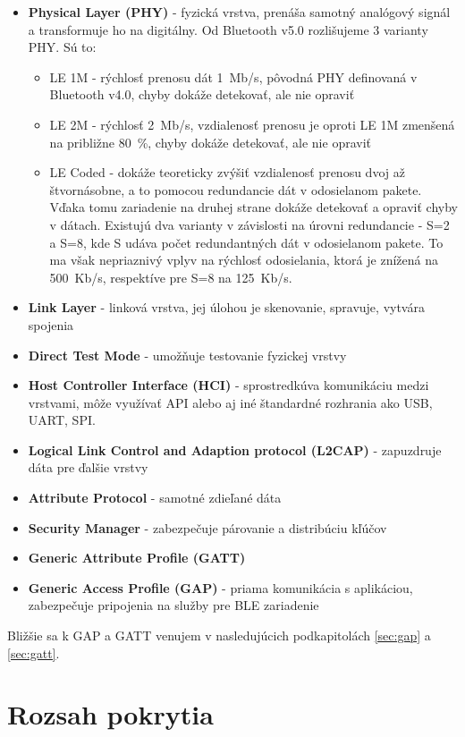 \begin{itemize}
    \item \textbf{Physical Layer (PHY)} - fyzická vrstva, prenáša samotný analógový signál a transformuje ho na digitálny. Od Bluetooth v5.0 rozlišujeme 3 varianty PHY. Sú to:
    \begin{itemize}
        \item LE 1M - rýchlosť prenosu dát 1~Mb/s, pôvodná PHY definovaná v Bluetooth v4.0, chyby dokáže detekovať, ale nie opraviť
        \item LE 2M - rýchlosť 2~Mb/s, vzdialenosť prenosu je oproti LE 1M zmenšená na približne 80~\%, chyby dokáže detekovať, ale nie opraviť
        \item LE Coded - dokáže teoreticky zvýšiť vzdialenosť prenosu dvoj až štvornásobne, a to pomocou redundancie dát v odosielanom pakete. Vďaka tomu zariadenie na druhej strane dokáže detekovať a opraviť chyby v dátach. Existujú dva varianty v závislosti na úrovni redundancie - S=2 a S=8, kde S udáva počet redundantných dát v odosielanom pakete. To ma však nepriaznivý vplyv na rýchlosť odosielania, ktorá je znížená na 500~Kb/s, respektíve pre S=8 na 125~Kb/s. 
    \end{itemize}
    \item \textbf{Link Layer} - linková vrstva, jej úlohou je skenovanie, spravuje, vytvára spojenia
    \item \textbf{Direct Test Mode} - umožňuje testovanie fyzickej vrstvy
    \item \textbf{Host Controller Interface (HCI)} - sprostredkúva komunikáciu medzi vrstvami, môže využívať API alebo aj iné štandardné rozhrania ako USB, UART, SPI. 
    \item \textbf{Logical Link Control and Adaption protocol (L2CAP)} - zapuzdruje dáta pre ďalšie vrstvy
    \item \textbf{Attribute Protocol} - samotné zdieľané dáta
    \item \textbf{Security Manager} - zabezpečuje párovanie a distribúciu kľúčov
    \item \textbf{Generic Attribute Profile (GATT)}
    \item \textbf{Generic Access Profile (GAP)} - priama komunikácia s aplikáciou, zabezpečuje pripojenia na služby pre BLE zariadenie
    \cite{bluetooth}\cite{ble-arch}
\end{itemize}
Bližšie sa k GAP a GATT venujem v nasledujúcich podkapitolách \ref{sec:gap} a \ref{sec:gatt}.

\section{Rozsah pokrytia}

